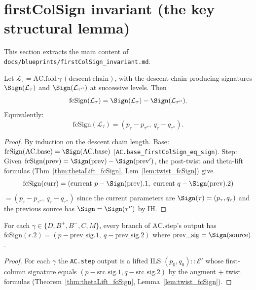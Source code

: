 \section{firstColSign invariant (the key structural lemma)}

This section extracts the main content of
\texttt{docs/blueprints/firstColSign\_invariant.md}.

\begin{theorem}
  \label{thm:fcSign_diff}
  \leanok
  Let $\mathcal{L}_\tau = \mathrm{AC.fold}\,\gamma\,(\mathrm{descent\ chain})$, with
  the descent chain producing signatures $\Sign(\mathcal{L}_\tau)$ and
  $\Sign(\mathcal{L}_{\tau''})$ at successive levels. Then
  \[ \mathrm{fcSign}(\mathcal{L}_\tau) = \Sign(\mathcal{L}_\tau) - \Sign(\mathcal{L}_{\tau''}). \]
  Equivalently:
  \[ \mathrm{fcSign}(\mathcal{L}_\tau) = (p_\tau - p_{\tau''},\ q_\tau - q_{\tau''}). \]
\end{theorem}

\begin{proof}
  \leanok
  By induction on the descent chain length. Base: $\mathrm{fcSign}(\mathrm{AC.base}) = \Sign(\mathrm{AC.base})$ (\texttt{AC.base\_firstColSign\_eq\_sign}).
  Step: Given $\mathrm{fcSign}(\text{prev}) = \Sign(\text{prev}) - \Sign(\text{prev}')$, the post-twist and theta-lift formulas (Thm~\ref{thm:thetaLift_fcSign}, Lem~\ref{lem:twist_fcSign}) give
  \[ \mathrm{fcSign}(\text{curr}) = (\text{current } p - \Sign(\text{prev}).1,\ \text{current } q - \Sign(\text{prev}).2) \]
  $= (p_\tau - p_{\tau''},\ q_\tau - q_{\tau''})$ since the current parameters are $\Sign(\tau) = (p_\tau, q_\tau)$ and the previous source has $\Sign = \Sign(\tau'')$ by IH.
\end{proof}

\begin{theorem}
  \label{thm:AC_step_fcSign}
  \leanok
  For each $\gamma \in \{D, B^+, B^-, C, M\}$, every branch of $\mathrm{AC.step}$'s output has
  $\mathrm{fcSign}(r.2) = (p - \mathrm{prev\_sig}.1,\ q - \mathrm{prev\_sig}.2)$ where $\mathrm{prev\_sig} = \Sign(\text{source})$.
\end{theorem}
\begin{proof}
  \leanok
  For each $\gamma$ the \texttt{AC.step} output is a lifted ILS $(p_0, q_0) :: \mathcal{E}'$ whose first-column signature equals $(p - \mathrm{src\_sig}.1, q - \mathrm{src\_sig}.2)$ by the augment + twist formulas (Theorem~\ref{thm:thetaLift_fcSign}, Lemma~\ref{lem:twist_fcSign}).
\end{proof}


